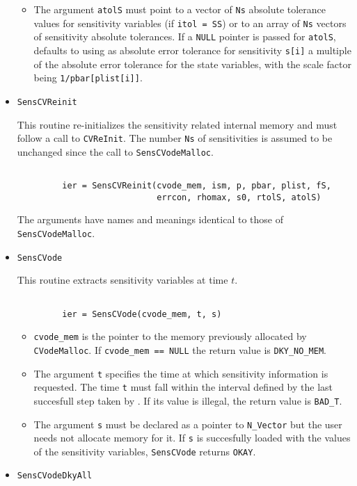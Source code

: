 \begin{itemize}
\begin{itemize}
\item The argument {\tt atolS} must point to a vector of {\tt Ns} absolute
  tolerance values for sensitivity variables (if {\tt itol = SS}) or to
  an array of {\tt Ns} vectors of sensitivity absolute tolerances.
  If a {\tt NULL} pointer is passed for {\tt atolS}, {\codeS} defaults to using
  as absolute error tolerance for sensitivity {\tt s[i]} a multiple of the
  absolute error tolerance for the state variables, with the scale factor
  being {\tt 1/pbar[plist[i]]}.
\end{itemize}

\item {\tt SensCVReinit}

This routine re-initializes the sensitivity related internal memory and must
follow a call to {\tt CVReInit}. The number {\tt Ns} of sensitivities is 
assumed to be unchanged since the call to {\tt SensCVodeMalloc}.
\begin{verbatim}

         ier = SensCVReinit(cvode_mem, ism, p, pbar, plist, fS, 
                            errcon, rhomax, s0, rtolS, atolS)

\end{verbatim}

The arguments have names and meanings identical to those of {\tt SensCVodeMalloc}.
\item {\tt SensCVode}

This routine extracts sensitivity variables at time $t$.
\begin{verbatim}

         ier = SensCVode(cvode_mem, t, s)

\end{verbatim}

\begin{itemize}
\item {\tt cvode\_mem} is the pointer to the memory previously allocated
  by {\tt CVodeMalloc}. If {\tt cvode\_mem == NULL} the return value is
  {\tt DKY\_NO\_MEM}.

\item The argument {\tt t} specifies the time at which sensitivity information is 
  requested. The time {\tt t} must fall within the interval defined by the last 
  succesfull step taken by {\codeS}. If its value is illegal, the return value
  is {\tt BAD\_T}.

\item The argument {\tt s} must be declared as a pointer to {\tt N\_Vector} but the
  user needs not allocate memory for it. If {\tt s} is succesfully loaded
  with the values of the sensitivity variables, {\tt SensCVode} returns {\tt OKAY}.
\end{itemize}
\item {\tt SensCVodeDkyAll}


\end{itemize}
